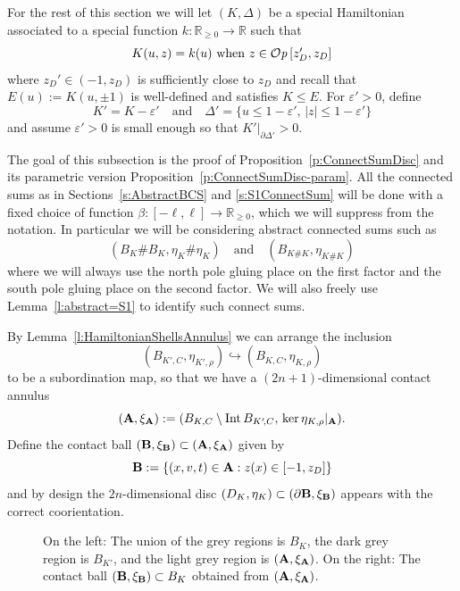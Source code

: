 \documentclass[12pt]{paper}
\theoremstyle{plain}
\theoremstyle{definition}
\newcommand{\p}{\partial}
\newcommand{\eps}{\varepsilon}
\newcommand{\abs}[1]{\left| #1 \right|}
\newcommand{\R}{{\mathbb{R}}}
\newcommand{\A}{{\bf A}}
\newcommand{\B}{{\bf B}}
\newcommand{\Int}{{\rm Int\,}} %
\def\Op{{\mathcal O}{\it p}\,}
\numberwithin{figure}{section}
\begin{document}
For the rest of this section we will let $(K, \Delta)$ be a special Hamiltonian associated to a special function 
$k: \R_{\geq 0} \to \R$ such that 
\begin{equation}\label{e:special3}
\mbox{$K(u,z) = k(u)$ when $z \in \Op [z_D', z_D]$}
\end{equation}
where $z_D' \in (-1, z_D)$ is sufficiently close to $z_D$
and recall that $E(u) := K(u, \pm 1)$ is well-defined and satisfies $K \leq E$.  For $\eps' > 0$, define
$$
	K' = K - \eps' \quad\mbox{and}\quad \Delta' = \{u \leq 1-\eps',\, \abs{z} \leq 1-\eps'\}
$$
and assume $\eps' > 0$ is small enough so that $K'|_{\p \Delta'} > 0$.

The goal of this subsection is  the proof of Proposition~\ref{p:ConnectSumDisc}
and its parametric version Proposition~\ref{p:ConnectSumDisc-param}.
All the connected sums as in Sections~\ref{s:AbstractBCS} and \ref{s:S1ConnectSum} will be done
with a fixed choice of function $\beta: [-\ell, \ell] \to \R_{\geq 0}$, which we will suppress from the notation.  In particular
we will be considering abstract connected sums such as
$$
	(B_{K} \# B_{K}, \eta_{K} \# \eta_{K}) \quad\mbox{and}\quad
	(B_{K\#K}, \eta_{K \# K})
$$
where we will always use the north pole gluing place on the first factor and the south pole gluing place on the second factor.
We will also freely use Lemma~\ref{l:abstract=S1} to identify such connect sums.

By Lemma~\ref{l:HamiltonianShellsAnnulus} we can arrange the inclusion 
$$(B_{K'\!,C}, \eta_{K'\!, \rho}) \hookrightarrow (B_{K,C}, \eta_{K, \rho})$$   to be  a subordination map,
so that we have a $(2n+1)$-dimensional contact annulus
	$$
		(\A, \xi_{\A}) := (B_{K,C} \setminus \Int B_{K'\!,C},\, \ker \eta_{K, \rho}|_{\A}).
	$$
Define the contact ball $(\B, \xi_\B) \subset (\A, \xi_\A)$ given by
	\begin{equation}\label{e:ModelOtBall}
		 \B:= \{(x,v,t) \in \A : z(x) \in [-1, z_D]\}
	\end{equation}
and by design the $2n$-dimensional disc $(D_K, \eta_K) \subset (\p\B, \xi_\B)$ appears with the correct coorientation.	
\begin{figure}[h]
   \centering
   \def\svgwidth{450pt}
   
   \caption{On the left: The union of the grey regions is $B_K$,
   the dark grey region is $B_{K'}$, and the light grey region is
   $(\A, \xi_{\A})$.
   On the right: The contact ball $(\B, \xi_{\B}) \subset B_K$
   obtained from $(\A, \xi_{\A})$.}
  \label{f:embedHamiltonian2}
\end{figure}
\end{document}
